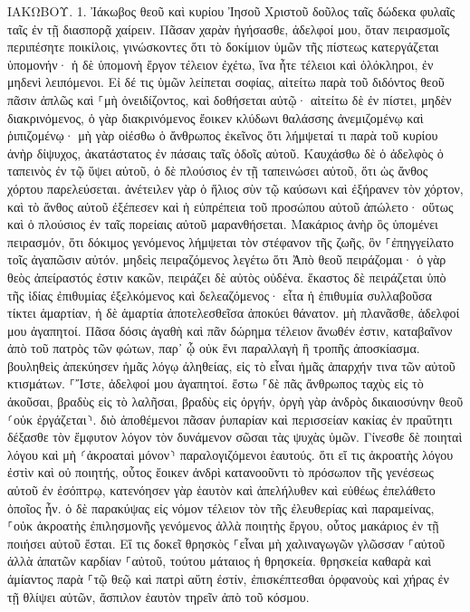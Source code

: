 \documentclass[twoside, 9pt]{extreport}
\begin{document}
ΙΑΚΩΒΟΥ.
1.
Ἰάκωβος θεοῦ καὶ κυρίου Ἰησοῦ Χριστοῦ δοῦλος ταῖς δώδεκα φυλαῖς ταῖς ἐν τῇ διασπορᾷ χαίρειν. 
Πᾶσαν χαρὰν ἡγήσασθε, ἀδελφοί μου, ὅταν πειρασμοῖς περιπέσητε ποικίλοις, 
γινώσκοντες ὅτι τὸ δοκίμιον ὑμῶν τῆς πίστεως κατεργάζεται ὑπομονήν· 
ἡ δὲ ὑπομονὴ ἔργον τέλειον ἐχέτω, ἵνα ἦτε τέλειοι καὶ ὁλόκληροι, ἐν μηδενὶ λειπόμενοι. 
Εἰ δέ τις ὑμῶν λείπεται σοφίας, αἰτείτω παρὰ τοῦ διδόντος θεοῦ πᾶσιν ἁπλῶς καὶ ⸀μὴ ὀνειδίζοντος, καὶ δοθήσεται αὐτῷ· 
αἰτείτω δὲ ἐν πίστει, μηδὲν διακρινόμενος, ὁ γὰρ διακρινόμενος ἔοικεν κλύδωνι θαλάσσης ἀνεμιζομένῳ καὶ ῥιπιζομένῳ· 
μὴ γὰρ οἰέσθω ὁ ἄνθρωπος ἐκεῖνος ὅτι λήμψεταί τι παρὰ τοῦ κυρίου 
ἀνὴρ δίψυχος, ἀκατάστατος ἐν πάσαις ταῖς ὁδοῖς αὐτοῦ. 
Καυχάσθω δὲ ὁ ἀδελφὸς ὁ ταπεινὸς ἐν τῷ ὕψει αὐτοῦ, 
ὁ δὲ πλούσιος ἐν τῇ ταπεινώσει αὐτοῦ, ὅτι ὡς ἄνθος χόρτου παρελεύσεται. 
ἀνέτειλεν γὰρ ὁ ἥλιος σὺν τῷ καύσωνι καὶ ἐξήρανεν τὸν χόρτον, καὶ τὸ ἄνθος αὐτοῦ ἐξέπεσεν καὶ ἡ εὐπρέπεια τοῦ προσώπου αὐτοῦ ἀπώλετο· οὕτως καὶ ὁ πλούσιος ἐν ταῖς πορείαις αὐτοῦ μαρανθήσεται. 
Μακάριος ἀνὴρ ὃς ὑπομένει πειρασμόν, ὅτι δόκιμος γενόμενος λήμψεται τὸν στέφανον τῆς ζωῆς, ὃν ⸀ἐπηγγείλατο τοῖς ἀγαπῶσιν αὐτόν. 
μηδεὶς πειραζόμενος λεγέτω ὅτι Ἀπὸ θεοῦ πειράζομαι· ὁ γὰρ θεὸς ἀπείραστός ἐστιν κακῶν, πειράζει δὲ αὐτὸς οὐδένα. 
ἕκαστος δὲ πειράζεται ὑπὸ τῆς ἰδίας ἐπιθυμίας ἐξελκόμενος καὶ δελεαζόμενος· 
εἶτα ἡ ἐπιθυμία συλλαβοῦσα τίκτει ἁμαρτίαν, ἡ δὲ ἁμαρτία ἀποτελεσθεῖσα ἀποκύει θάνατον. 
μὴ πλανᾶσθε, ἀδελφοί μου ἀγαπητοί. 
Πᾶσα δόσις ἀγαθὴ καὶ πᾶν δώρημα τέλειον ἄνωθέν ἐστιν, καταβαῖνον ἀπὸ τοῦ πατρὸς τῶν φώτων, παρ᾽ ᾧ οὐκ ἔνι παραλλαγὴ ἢ τροπῆς ἀποσκίασμα. 
βουληθεὶς ἀπεκύησεν ἡμᾶς λόγῳ ἀληθείας, εἰς τὸ εἶναι ἡμᾶς ἀπαρχήν τινα τῶν αὐτοῦ κτισμάτων. 
⸀Ἴστε, ἀδελφοί μου ἀγαπητοί. ἔστω ⸀δὲ πᾶς ἄνθρωπος ταχὺς εἰς τὸ ἀκοῦσαι, βραδὺς εἰς τὸ λαλῆσαι, βραδὺς εἰς ὀργήν, 
ὀργὴ γὰρ ἀνδρὸς δικαιοσύνην θεοῦ ⸂οὐκ ἐργάζεται⸃. 
διὸ ἀποθέμενοι πᾶσαν ῥυπαρίαν καὶ περισσείαν κακίας ἐν πραΰτητι δέξασθε τὸν ἔμφυτον λόγον τὸν δυνάμενον σῶσαι τὰς ψυχὰς ὑμῶν. 
Γίνεσθε δὲ ποιηταὶ λόγου καὶ μὴ ⸂ἀκροαταὶ μόνον⸃ παραλογιζόμενοι ἑαυτούς. 
ὅτι εἴ τις ἀκροατὴς λόγου ἐστὶν καὶ οὐ ποιητής, οὗτος ἔοικεν ἀνδρὶ κατανοοῦντι τὸ πρόσωπον τῆς γενέσεως αὐτοῦ ἐν ἐσόπτρῳ, 
κατενόησεν γὰρ ἑαυτὸν καὶ ἀπελήλυθεν καὶ εὐθέως ἐπελάθετο ὁποῖος ἦν. 
ὁ δὲ παρακύψας εἰς νόμον τέλειον τὸν τῆς ἐλευθερίας καὶ παραμείνας, ⸀οὐκ ἀκροατὴς ἐπιλησμονῆς γενόμενος ἀλλὰ ποιητὴς ἔργου, οὗτος μακάριος ἐν τῇ ποιήσει αὐτοῦ ἔσται. 
Εἴ τις δοκεῖ θρησκὸς ⸀εἶναι μὴ χαλιναγωγῶν γλῶσσαν ⸀αὐτοῦ ἀλλὰ ἀπατῶν καρδίαν ⸀αὐτοῦ, τούτου μάταιος ἡ θρησκεία. 
θρησκεία καθαρὰ καὶ ἀμίαντος παρὰ ⸀τῷ θεῷ καὶ πατρὶ αὕτη ἐστίν, ἐπισκέπτεσθαι ὀρφανοὺς καὶ χήρας ἐν τῇ θλίψει αὐτῶν, ἄσπιλον ἑαυτὸν τηρεῖν ἀπὸ τοῦ κόσμου. 
\end{document}
